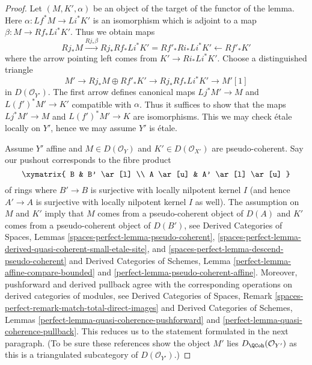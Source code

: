 \begin{proof}
Let $(M, K', \alpha)$ be an object of the target of the functor
of the lemma. Here $\alpha : Lf^*M \to Li^*K'$
is an isomorphism which is adjoint to a map $\beta : M \to Rf_*Li^*K'$.
Thus we obtain maps
$$
Rj_*M \xrightarrow{Rj_*\beta}
Rj_*Rf_*Li^*K' = Rf'_*Ri_*Li^*K' \leftarrow Rf'_*K'
$$
where the arrow pointing left comes from $K' \to Ri_*Li^*K'$.
Choose a distinguished triangle
$$
M' \to Rj_*M \oplus Rf'_*K' \to Rj_*Rf_*Li^*K' \to M'[1]
$$
in $D(\mathcal{O}_{Y'})$. The first arrow defines canonical maps
$Lj^*M' \to M$ and $L(f')^*M' \to K'$ compatible with $\alpha$.
Thus it suffices to show that the maps
$Lj^*M' \to M$ and $L(f')^*M' \to K$ are isomorphisms.
This we may check \'etale locally on $Y'$, hence we may
assume $Y'$ is \'etale.

\medskip\noindent
Assume $Y'$ affine and $M \in D(\mathcal{O}_Y)$
and $K' \in D(\mathcal{O}_{X'})$ are pseudo-coherent.
Say our pushout corresponds to the fibre product
$$
\xymatrix{
B & B' \ar[l] \\
A \ar[u] & A' \ar[l] \ar[u]
}
$$
of rings where $B' \to B$ is surjective with locally nilpotent kernel $I$
(and hence $A' \to A$ is surjective with locally nilpotent kernel $I$ as well).
The assumption on $M$ and $K'$ imply that $M$ comes from a pseudo-coherent
object of $D(A)$ and $K'$ comes from a pseudo-coherent object of $D(B')$, see
Derived Categories of Spaces, Lemmas
\ref{spaces-perfect-lemma-pseudo-coherent},
\ref{spaces-perfect-lemma-derived-quasi-coherent-small-etale-site}, and
\ref{spaces-perfect-lemma-descend-pseudo-coherent}
and
Derived Categories of Schemes, Lemma
\ref{perfect-lemma-affine-compare-bounded} and
\ref{perfect-lemma-pseudo-coherent-affine}.
Moreover, pushforward and derived pullback agree with the
corresponding operations on derived categories of modules, see
Derived Categories of Spaces, Remark
\ref{spaces-perfect-remark-match-total-direct-images}
and
Derived Categories of Schemes, Lemmas
\ref{perfect-lemma-quasi-coherence-pushforward} and
\ref{perfect-lemma-quasi-coherence-pullback}.
This reduces us to the statement formulated in the next paragraph.
(To be sure these references show
the object $M'$ lies $D_\QCoh(\mathcal{O}_{Y'})$
as this is a triangulated subcategory of $D(\mathcal{O}_{Y'})$.)


\end{proof}
